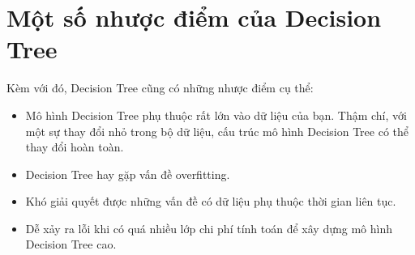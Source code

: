 \section{Một số nhược điểm của Decision Tree}
Kèm với đó, Decision Tree cũng có những nhược điểm cụ thể:

\begin{itemize}
    \item Mô hình Decision Tree phụ thuộc rất lớn vào dữ liệu của bạn. Thậm chí, với một sự thay đổi nhỏ trong bộ dữ liệu, cấu trúc mô hình Decision Tree có thể thay đổi hoàn toàn.
    \item Decision Tree hay gặp vấn đề overfitting.
    \item Khó giải quyết được những vấn đề có dữ liệu phụ thuộc thời gian liên tục.
    \item Dễ xảy ra lỗi khi có quá nhiều lớp chi phí tính toán để xây dựng mô hình Decision Tree cao.
\end{itemize}
